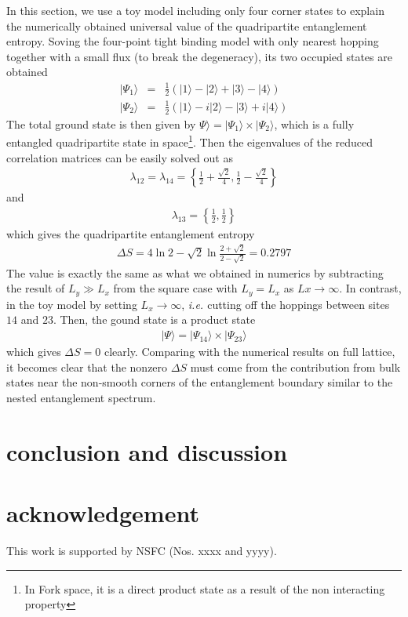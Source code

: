 \documentclass[aps,twocolumn,superscriptaddress]{revtex4-1}
\newcommand{\ie}{\textit{i.e.{ }}}
\begin{document}
In this section, we use a toy model including only four corner states to explain the numerically obtained universal
value of the quadripartite entanglement entropy. Soving the four-point tight binding model with only nearest hopping
together with a small flux (to break the degeneracy), its two occupied states are obtained
\begin{eqnarray}
  |\Psi_1\rangle&=&\frac12\left(|1\rangle-|2\rangle+|3\rangle-|4\rangle\right) \\
  |\Psi_2\rangle&=&\frac12\left(|1\rangle-i|2\rangle-|3\rangle+i|4\rangle\right) 
\end{eqnarray}
The total ground state is then given by $\Psi\rangle=|\Psi_1\rangle \times |\Psi_2\rangle$, which is a fully entangled
quadripartite state in space\footnote{In Fork space, it is a direct product state as a result of the non interacting
property}. Then the eigenvalues of the reduced correlation matrices can be easily solved out as
\begin{eqnarray}
  \lambda_{12}=\lambda_{14}=\left\{\frac{1}{2}+\frac{\sqrt{2}}{4},\frac{1}{2}-\frac{\sqrt{2}}{4}\right\}
\end{eqnarray}
and
\begin{eqnarray}
  \lambda_{13}=\left\{\frac{1}{2},\frac{1}{2}\right\}
\end{eqnarray}
which gives the quadripartite entanglement entropy
\begin{eqnarray}
  \Delta S= 4\ln2-\sqrt{2}\ln\frac{2+\sqrt{2}}{2-\sqrt{2}}=0.2797
\end{eqnarray}
The value is exactly the same as what we obtained in numerics by subtracting the result of $L_y\gg L_x$ 
from the square case with $L_y=L_x$ as $Lx\rightarrow\infty$. 
In contrast, in the toy model by setting $L_x\rightarrow\infty$, \ie cutting off the hoppings between sites $14$ and
$23$. Then, the gound state is a product state
\begin{eqnarray}
  |\Psi\rangle=|\Psi_{14}\rangle \times |\Psi_{23}\rangle
\end{eqnarray}
which gives $\Delta S=0$ clearly. Comparing with the numerical results on full lattice, it becomes clear that the
nonzero $\Delta S$ must come from the contribution from bulk states near the non-smooth corners of the entanglement 
boundary \cite{Laflorencie2016} similar to the nested entanglement spectrum\cite{Schindler2017}. 

\section{conclusion and discussion}

\section{acknowledgement}
This work is supported by NSFC (Nos. xxxx and yyyy).


\end{document}
